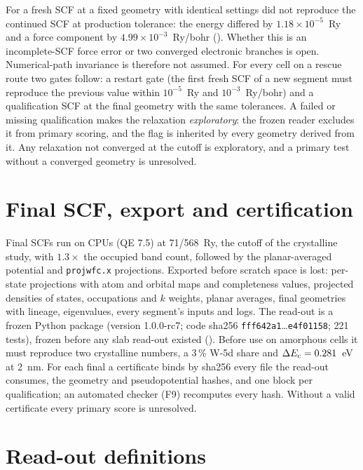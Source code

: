 For  a fresh SCF at a fixed geometry with identical settings did not reproduce the continued SCF at
production tolerance: the energy differed by $1.18\times10^{-5}$~Ry and a force component by $4.99\times10^{-3}$~Ry/bohr
(). Whether this is an incomplete-SCF force error or two converged electronic branches is open.
Numerical-path invariance is therefore not assumed. For every cell on a rescue route two gates follow: a restart gate
(the first fresh SCF of a new segment must reproduce the previous value within $10^{-5}$~Ry and $10^{-3}$~Ry/bohr) and
a qualification SCF at the final geometry with the same tolerances. A failed or missing qualification makes the
relaxation \emph{exploratory}: the frozen reader excludes it from primary scoring, and the flag is inherited by every
geometry derived from it. Any relaxation not converged at the cutoff is exploratory, and a primary test without a
converged geometry is unresolved.

\section{Final SCF, export and certification}
\label{sec:mono-am-final}

Final SCFs run on CPUs (QE 7.5) at 71/568~Ry, the cutoff of the crystalline study, with $1.3\times$ the occupied band
count, followed by the planar-averaged potential and \texttt{projwfc.x} projections. Exported before scratch space is
lost: per-state projections with atom and orbital maps and completeness values, projected densities of states,
occupations and $k$ weights, planar averages, final geometries with lineage, eigenvalues, every segment's inputs and
logs. The read-out is a frozen Python package (version 1.0.0-rc7; code sha256 \texttt{fff642a1}\ldots\texttt{e4f01158};
221 tests), frozen before any slab read-out existed (). Before use on amorphous cells it must reproduce two
crystalline numbers, a 3\,\% W-5d share and $\Delta E_{\mathrm{c}} = 0.281$~eV at 2~nm. For each final a certificate binds by sha256
every file the read-out consumes, the geometry and pseudopotential hashes, and one block per qualification; an
automated checker (F9) recomputes every hash. Without a valid certificate every primary score is unresolved.

\section{Read-out definitions}
\label{sec:mono-am-defs}

